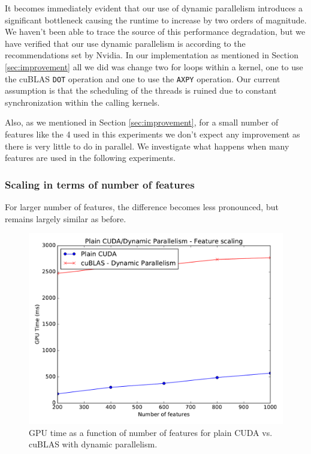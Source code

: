 \documentclass[11pt,a4paper]{article}
\begin{document}
It becomes immediately evident that our use of dynamic parallelism introduces
a significant bottleneck causing the runtime to increase by two orders of magnitude.
We haven't been able to trace the source of this performance degradation, but we have
verified that our use dynamic parallelism is according to the recommendations set
by Nvidia. In our implementation as mentioned in Section \ref{sec:improvement} all
we did was change two for loops within a kernel, one to use the cuBLAS \texttt{DOT} operation
and one to use the \texttt{AXPY} operation. Our current assumption is that the scheduling
of the threads is ruined due to constant synchronization within the calling kernels.

Also, as we mentioned in Section \ref{sec:improvement}, for a small number of features like the
4 used in this experiments we don't expect any improvement as there is very little to do in parallel.
We investigate what happens when many features are used in the following experiments.

\pagebreak

\subsubsection*{Scaling in terms of number of features}

For larger number of features, the difference becomes less pronounced, but remains largely similar
as before.

\begin{figure}[H]
	\centering
	\includegraphics[width=0.8\linewidth]{gpu_plain_vs_Lvl1cuBLAS-200f-1000f.pdf}
	\caption{GPU time as a function of number of features for plain CUDA vs. cuBLAS with dynamic parallelism.}
	\label{fig:plain-dpar-n-features}
\end{figure}
\end{document}
